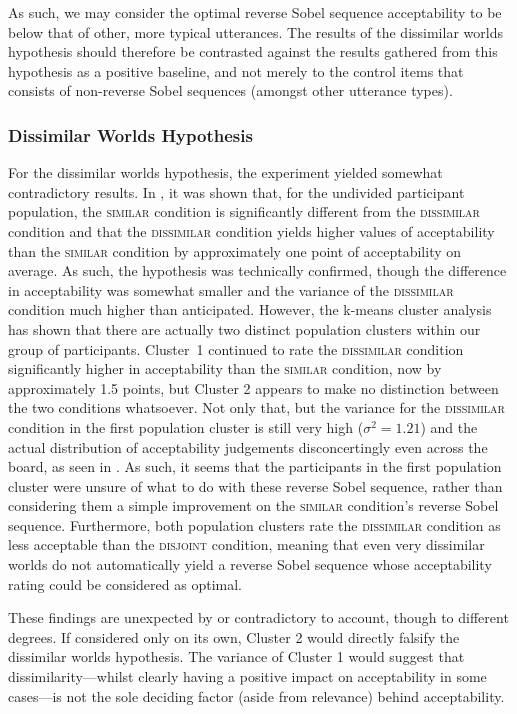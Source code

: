 As such, we may consider the optimal reverse Sobel sequence acceptability to be below that of other, more typical utterances. The results of the dissimilar worlds hypothesis should therefore be contrasted against the results gathered from this hypothesis as a positive baseline, and not merely to the control items that consists of non-reverse Sobel sequences (amongst other utterance types).

\subsubsection{Dissimilar Worlds Hypothesis}
For the dissimilar worlds hypothesis, the experiment yielded somewhat contradictory results. In , it was shown that, for the undivided participant population, the {\scshape similar} condition is significantly different from the {\scshape dissimilar} condition and that the {\scshape dissimilar} condition yields higher values of acceptability than the {\scshape similar} condition by approximately one point of acceptability on average. As such, the hypothesis was technically confirmed, though the difference in acceptability was somewhat smaller and the variance of the {\scshape dissimilar} condition much higher than anticipated. However, the k-means cluster analysis has shown that there are actually two distinct population clusters within our group of participants. Cluster~1 continued to rate the {\scshape dissimilar} condition significantly higher in acceptability than the {\scshape similar} condition, now by approximately 1.5 points, but Cluster 2 appears to make no distinction between the two conditions whatsoever. Not only that, but the variance for the {\scshape dissimilar} condition in the first population cluster is still very high ($\sigma^2=1.21$) and the actual distribution of acceptability judgements disconcertingly even across the board, as seen in . As such, it seems that the participants in the first population cluster were unsure of what to do with these reverse Sobel sequence, rather than considering them a simple improvement on the {\scshape similar} condition's reverse Sobel sequence. Furthermore, both population clusters rate the {\scshape dissimilar} condition as less acceptable than the {\scshape disjoint} condition, meaning that even very dissimilar worlds do not automatically yield a reverse Sobel sequence whose acceptability rating could be considered as optimal.

These findings are unexpected by or contradictory to  account, though to different degrees. If considered only on its own, Cluster 2 would directly falsify the dissimilar worlds hypothesis. The variance of Cluster 1 would suggest that dissimilarity---whilst clearly having a positive impact on acceptability in some cases---is not the sole deciding factor (aside from relevance) behind acceptability.

